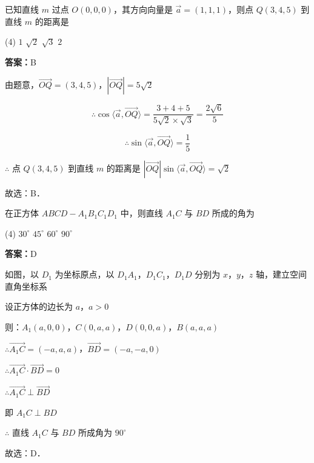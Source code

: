 \vspace{2em}

\begin{example}[\bkstar{3}{5}]
已知直线 $m$ 过点 $O(0,0,0)$，其方向向量是 $\overrightarrow{a}=(1,1,1)$，则点 $Q(3,4,5)$ 到直线 $m$ 的距离是
\begin{tasks}(4)
    \task $1$
    \task $\sqrt{2}$
    \task $\sqrt{3}$
    \task $2$
\end{tasks}
\end{example}
\begin{solution}
\textbf{答案：}B

由题意，$\overrightarrow{OQ}=(3,4,5)$，$\left|\overrightarrow{OQ}\right|=5\sqrt{2}$

$$
\therefore \cos\langle\overrightarrow{a},\overrightarrow{OQ}\rangle=\dfrac{3+4+5}{5\sqrt{2}\times\sqrt{3}}=\dfrac{2\sqrt{6}}{5}
$$

$$
\therefore \sin\langle\overrightarrow{a},\overrightarrow{OQ}\rangle=\dfrac{1}{5}
$$

$\therefore$ 点 $Q(3,4,5)$ 到直线 $m$ 的距离是 $\left|\overrightarrow{OQ}\right|\sin\langle\overrightarrow{a},\overrightarrow{OQ}\rangle=\sqrt{2}$

故选：B．
\end{solution}

\vspace{2em}


\begin{example}[\bkstar{2}{5}]
在正方体 $ABCD-A_1B_1C_1D_1$ 中，则直线 $A_1C$ 与 $BD$ 所成的角为
\begin{tasks}(4)
    \task $30^{\circ}$
    \task $45^{\circ}$
    \task $60^{\circ}$
    \task $90^{\circ}$
\end{tasks}
\end{example}
\begin{solution}
\textbf{答案：}D

如图，以 $D_1$ 为坐标原点，以 $D_1A_1$，$D_1C_1$，$D_1D$ 分别为 $x$，$y$，$z$ 轴，建立空间直角坐标系

设正方体的边长为 $a$，$a>0$

则：$A_1(a,0,0)$，$C(0,a,a)$，$D(0,0,a)$，$B(a,a,a)$

$\therefore \overrightarrow{A_1C}=(-a,a,a)$，$\overrightarrow{BD}=(-a,-a,0)$

$\therefore \overrightarrow{A_1C}\cdot\overrightarrow{BD}=0$

$\therefore \overrightarrow{A_1C}\perp\overrightarrow{BD}$

即 $A_1C\perp BD$

$\therefore$ 直线 $A_1C$ 与 $BD$ 所成角为 $90^{\circ}$

故选：D．
\end{solution}

